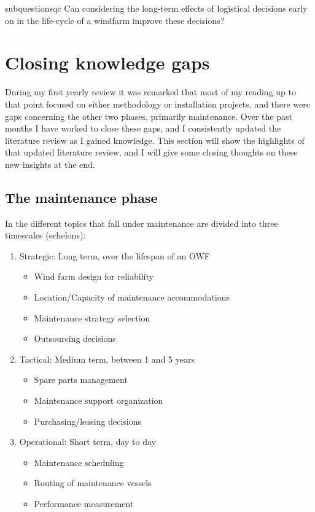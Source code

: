 \documentclass[a4paper,12pt]{article}
\begin{document}
\begin{restatable}{subquestion}{sqc}
\label{sqc}
Can considering the long-term effects of logistical decisions early on in the life-cycle of a windfarm improve these decisions? 
\end{restatable}

\pagebreak

\section{Closing knowledge gaps}\label{s:know}
During my first yearly review it was remarked that most of my reading up to that point focused on either methodology or installation projects, and there were gaps concerning the other two phases, primarily maintenance. Over the past months I have worked to close these gaps, and I consistently updated the literature review as I gained knowledge. This section will show the highlights of that updated literature review, and I will give some closing thoughts on these new insights at the end. 

\subsection{The maintenance phase} \label{ss:maint}
In \cite{shafiee2015maintenance} the different topics that fall under maintenance are divided into three timescales (echelons):

\begin{enumerate}
\item Strategic: Long term, over the lifespan of an OWF
\begin{itemize}
\item Wind farm design for reliability
\item Location/Capacity of maintenance accommodations
\item Maintenance strategy selection
\item Outsourcing decisions
\end{itemize}
\item Tactical: Medium term, between 1 and 5 years
\begin{itemize}
\item Spare parts management
\item Maintenance support organization
\item Purchasing/leasing decisions
\end{itemize}
\item Operational: Short term, day to day
\begin{itemize}
\item Maintenance scheduling
\item Routing of maintenance vessels
\item Performance measurement
\end{itemize}
\end{enumerate}
\end{document}
